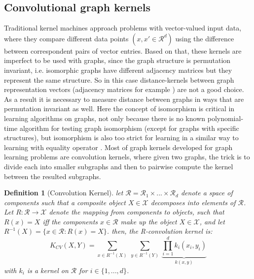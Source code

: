 \subsection{Convolutional graph kernels}
Traditional kernel machines approach problems with vector-valued input data, where they compare different data points $(x,x' \in \mathcal{R}^d)$ using the difference between correspondent pairs of vector entries. Based on that, these kernels are imperfect to be used with graphs, since the graph structure is permutation invariant, i.e. isomorphic graphs have different adjacency matrices but they represent the same structure. So in this case distance-kernels between graph representation vectors (adjacency matrices for example ) are not a good choice. As a result it is necessary to measure distance between graphs in ways that are  permutation invariant as well. Here the concept of isomorphism is critical in learning algorithms on graphs,  not only because there is no known polynomial-time algorithm for testing graph isomorphism (except for graphs with specific structures), but isomorphism is also too strict for learning in a similar way to learning with equality operator \citep{kriege_graph_kernels}. \newline
Most of graph kernels developed for graph learning problems are convolution kernels, where given two graphs, the trick is to divide each into smaller subgraphs and then to pairwise compute the kernel between the resulted subgraphs.
\newtheorem{definition}{Definition} 
\begin{definition}[Convolution Kernel]
let $\mathcal{R}=\mathcal{R}_1\times...\times \mathcal{R}_d$ denote a space of components such that a composite object $X\in \mathcal{X}$ decomposes into elements of $\mathcal{R}$. Let $R:\mathcal{R}\xrightarrow{}\mathcal{X}$ denote the mapping from components to objects, such that $R(x)=X$ iff the components $x\in \mathcal{R}$ make up the object $X\in \mathcal{X}$, and let $R^{-1}(X)=\{x\in\mathcal{R}:R(x)=X\}$. then, the R-convolution kernel is:
\begin{equation}
\label{eq:conolutional_kernels}
    K_{CV}(X,Y)=\sum_{x\in R^{-1}(X)}~\sum_{y\in R^{-1}(Y)}~\underbrace{\prod_{i=1}^{d}k_i(x_i,y_i)}_{k(x,y)}
\end{equation}
with $k_i$ is a kernel on $\mathcal{R}$ for $i\in\{1,...,d\}$.
\end{definition}

